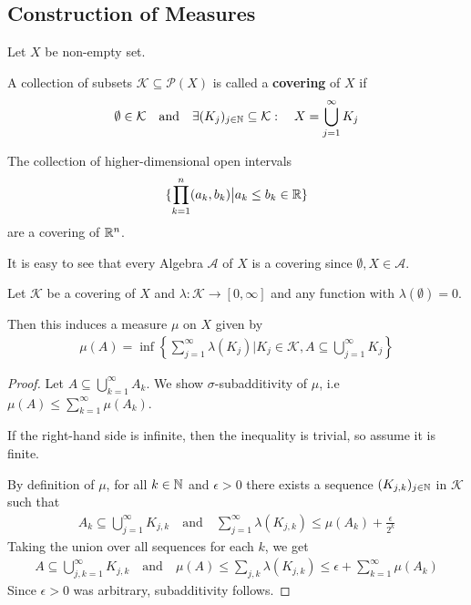 \subsection{Construction of Measures}
Let $X$ be non-empty set.

\begin{dfn}[]
  A collection of subsets $\mathcal{K} \subseteq \mathcal{P}(X)$ is called a \textbf{covering} of $X$ if
  \begin{align*}
    \emptyset \in \mathcal{K} \quad \text{and} \quad \exists (K_j)_{j \in \mathbb{N}} \subseteq \mathcal{K}: \quad X = \bigcup_{j=1}^{\infty}K_j
  \end{align*}
\end{dfn}
\begin{ex}[]
  The collection of higher-dimensional open intervals
  \begin{align*}
    \{\prod_{k=1}^{n}(a_k,b_k) \big\vert a_k \leq b_k \in \mathbb{R}\}
  \end{align*}
  are a covering of $\mathbb{R}^{n}$.

  It is easy to see that every Algebra $\mathcal{A}$ of $X$ is a covering since $\emptyset,X \in \mathcal{A}$.
\end{ex}

\begin{thm}[]
  Let $\mathcal{K}$ be a covering of $X$ and $\lambda: \mathcal{K} \to [0,\infty]$ and any function with $\lambda(\emptyset) = 0$. 

  Then this induces a measure $\mu$ on $X$ given by
  \begin{align*}
    \mu(A) = \inf \left\{
      \sum_{j=1}^{\infty}\lambda(K_j) \big\vert
      K_j \in \mathcal{K}, A \subseteq \bigcup_{j=1}^{\infty}K_j
    \right\}
  \end{align*}
\end{thm}
\begin{proof}
  Let $A \subseteq \bigcup_{k=1}^{\infty} A_k$.
  We show $\sigma$-subadditivity of $\mu$, i.e $\mu(A) \leq \sum_{k=1}^{\infty}\mu(A_k)$.

  If the right-hand side is infinite, then the inequality is trivial, so assume it is finite.

  By definition of $\mu$, for all $k \in \mathbb{N}$ and $\epsilon > 0$ there exists a sequence $(K_{j,k})_{j \in \mathbb{N}}$ in $\mathcal{K}$ such that
  \begin{align*}
    A_k \subseteq \bigcup_{j=1}^{\infty}K_{j,k} \quad \text{and} \quad \sum_{j=1}^{\infty} \lambda(K_{j,k}) \leq \mu(A_k) + \frac{\epsilon}{2^{k}}
  \end{align*}
  Taking the union over all sequences for each $k$, we get
  \begin{align*}
    A \subseteq \bigcup_{j,k = 1}^{\infty} K_{j,k} \quad \text{and} \quad 
    \mu(A) \leq \sum_{j,k} \lambda(K_{j,k}) \leq \epsilon + \sum_{k=1}^{\infty} \mu(A_k)
  \end{align*}
  Since $\epsilon > 0$ was arbitrary, subadditivity follows.
\end{proof}

